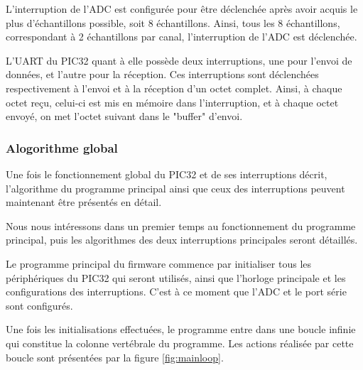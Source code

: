 \documentclass[letterpaper, twoside, 12pt, memoire, creativecommons, hyperref]{thETS}
\begin{document}
L'interruption de l'ADC est configurée pour être déclenchée après avoir acquis le plus d'échantillons possible, soit 8 échantillons. Ainsi, tous les 8 échantillons, correspondant à 2 échantillons par canal, l'interruption de l'ADC est déclenchée. 

L'UART du PIC32 quant à elle possède deux interruptions, une pour l'envoi de données, et l'autre pour la réception. Ces interruptions sont déclenchées respectivement à l'envoi et à la réception d'un octet complet. Ainsi, à chaque octet reçu, celui-ci est mis en mémoire dans l'interruption, et à chaque octet envoyé, on met l'octet suivant dans le "buffer" d'envoi.

\subsubsection{Alogorithme global}

Une fois le fonctionnement global du PIC32 et de ses interruptions décrit, l'algorithme du programme principal ainsi que ceux des interruptions peuvent maintenant être présentés en détail. 

Nous nous intéressons dans un premier temps au fonctionnement du programme principal, puis les algorithmes des deux interruptions principales seront détaillés. 

Le programme principal du firmware commence par initialiser tous les périphériques du PIC32 qui seront utilisés, ainsi que l'horloge principale et les configurations des interruptions. C'est à ce moment que l'ADC et le port série sont configurés. 

Une fois les initialisations effectuées, le programme entre dans une boucle infinie qui constitue la colonne vertébrale du programme. Les actions réalisée par cette boucle sont présentées par la figure \ref{fig:mainloop}.
\end{document}
